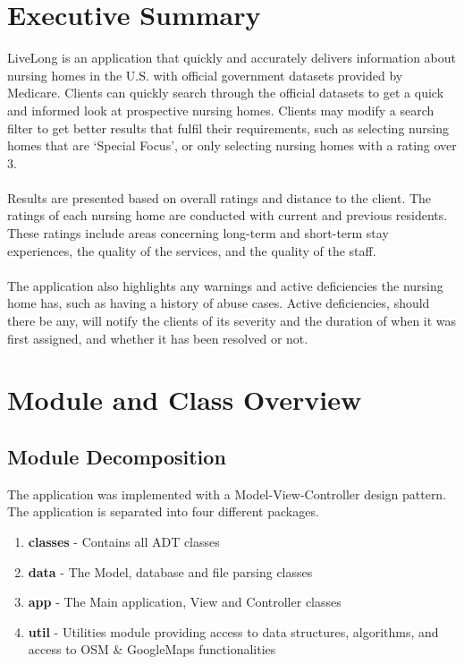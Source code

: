 \documentclass[12pt]{article}
\begin{document}
\newpage
\section{Executive Summary}
LiveLong is an application that quickly and accurately delivers information about nursing homes in the U.S. with official government datasets provided by Medicare. Clients can quickly search through the official datasets to get a quick and informed look at prospective nursing homes. Clients may modify a search filter to get better results that fulfil their requirements, such as selecting nursing homes that are ‘Special Focus’, or only selecting nursing homes with a rating over 3. \\ \\
Results are presented based on overall ratings and distance to the client. The ratings of each nursing home are conducted with current and previous residents. These ratings include areas concerning long-term and short-term stay experiences, the quality of the services, and the quality of the staff.
\\ \\
The application also highlights any warnings and active deficiencies the nursing home has, such as having a history of abuse cases. Active deficiencies, should there be any, will notify the clients of its severity and the duration of when it was first assigned, and whether it has been resolved or not.
\newpage
\section{Module and Class Overview}

\subsection{Module Decomposition}

The application was implemented with a Model-View-Controller design pattern. The application is separated into four different packages.
\begin{enumerate}
\item \textbf{classes} - Contains all ADT classes
\item \textbf{data} - The Model, database and file parsing classes
\item \textbf{app} - The Main application, View and Controller classes
\item \textbf{util} - Utilities module providing access to data structures, algorithms, and access to OSM \& GoogleMaps functionalities
\end{enumerate}
\end{document}
